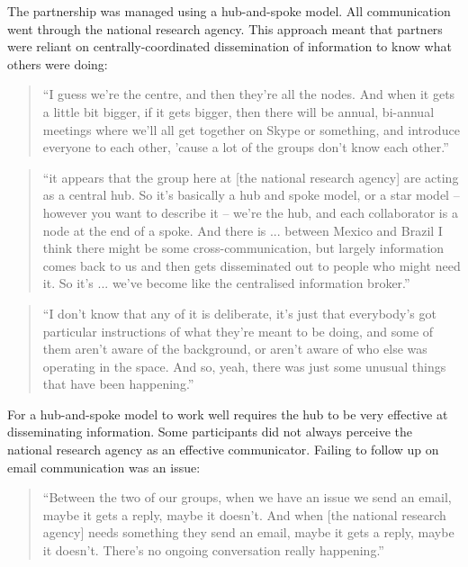 The partnership was managed using a hub-and-spoke model. All communication went through the national research agency. This approach meant that partners were reliant on centrally-coordinated dissemination of information to know what others were doing:

\begin{quote}
\small
\enquote{I guess we're the centre, and then they're all the nodes. And when it gets a little bit bigger, if it gets bigger, then there will be annual, bi-annual meetings where we'll all get together on Skype or something, and introduce everyone to each other, 'cause a lot of the groups don't know each other.} \\
\end{quote}

\begin{quote}
\small
\enquote{it appears that the group here at [the national research agency] are acting as a central hub.  So it’s basically a hub and spoke model, or a star model – however you want to describe it – we're the hub, and each collaborator is a node at the end of a spoke.  And there is ... between Mexico and Brazil I think there might be some cross-communication, but largely information comes back to us and then gets disseminated out to people who might need it.  So it's ... we've become like the centralised information broker.} \\
\end{quote}

\begin{quote}
\small
\enquote{I don't know that any of it is deliberate, it's just that everybody's got particular instructions of what they're meant to be doing, and some of them aren't aware of the background, or aren't aware of who else was operating in the space. And so, yeah, there was just some unusual things that have been happening.} \\
\end{quote}

For a hub-and-spoke model to work well requires the hub to be very effective at disseminating information. Some participants did not always perceive the national research agency as an effective communicator. Failing to follow up on email communication was an issue:

\begin{quote}
\small
\enquote{Between the two of our groups, when we have an issue we send an email, maybe it gets a reply, maybe it doesn't. And when [the national research agency] needs something they send an email, maybe it gets a reply, maybe it doesn't. There's  no ongoing conversation really happening.} \\
\end{quote}

